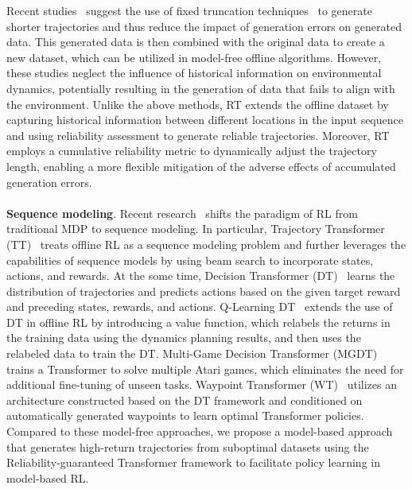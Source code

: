 Recent studies~\cite{DBLP:WangLJZLZ21,DBLP:LyuLL22,DBLP:LuBTP23,DBLP:abs-2406-12550} suggest the use of fixed truncation techniques~\cite{DBLP:JannerFZL19} to generate shorter trajectories and thus reduce the impact of generation errors on generated data.
This generated data is then combined with the original data to create a new dataset, which can be utilized in model-free offline algorithms.
However, these studies neglect the influence of historical information on environmental dynamics, potentially resulting in the generation of data that fails to align with the environment.
Unlike the above methods, RT extends the offline dataset by capturing historical information between different locations in the input sequence and using reliability assessment to generate reliable trajectories.
Moreover, RT employs a cumulative reliability metric to dynamically adjust the trajectory length, enabling a more flexible mitigation of the adverse effects of accumulated generation errors.
\\
\\
\textbf{Sequence modeling}.
Recent research~\cite{DBLP:JannerLL21,DBLP:DT,DBLP:YamagataKS23,DBLP:BadrinathFNB23,DBLP:GaoWCKZ024} shifts the paradigm of RL from traditional MDP to sequence modeling.
In particular, Trajectory Transformer (TT)~\cite{DBLP:JannerLL21} treats offline RL as a sequence modeling problem and further leverages the capabilities of sequence models by using beam search to incorporate states, actions, and rewards.
At the some time, Decision Transformer (DT)~\cite{DBLP:DT} learns the distribution of trajectories and predicts actions based on the given target reward and preceding states, rewards, and actions.
Q-Learning DT~\cite{DBLP:YamagataKS23} extends the use of DT in offline RL by introducing a value function, which relabels the returns in the training data using the dynamics planning results, and then uses the relabeled data to train the DT.
Multi-Game Decision Transformer (MGDT)~\cite{DBLP:LeeNYLFGFXJMM22} trains a Transformer to solve multiple Atari games, which eliminates the need for additional fine-tuning of unseen tasks.
Waypoint Transformer (WT)~\cite{DBLP:BadrinathFNB23} utilizes an architecture constructed based on the DT framework and conditioned on automatically generated waypoints to learn optimal Transformer policies.
Compared to these model-free approaches, we propose a model-based approach that generates high-return trajectories from suboptimal datasets using the Reliability-guaranteed Transformer framework  to facilitate policy learning in model-based RL.